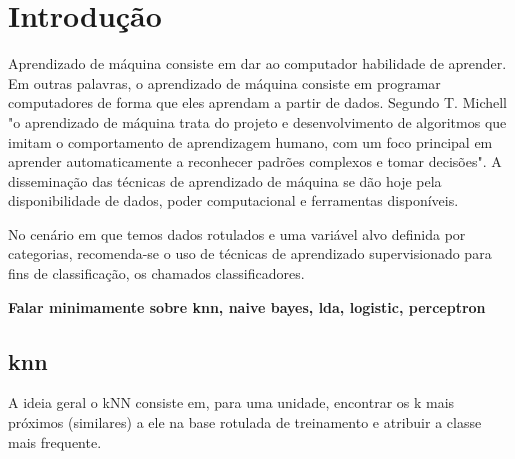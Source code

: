 \documentclass[
	12pt,				%
	openright,			%
	twoside,			%
	a4paper,			%
	english,			%
	brazil,				%
	svgnames
	]{abntex2}\usepackage[]{graphicx}\usepackage[]{color}
\begin{document}

\tableofcontents*
\cleardoublepage

\textual

\chapter{Introdução}
\label{cap:introducao}


Aprendizado de máquina consiste em dar ao computador habilidade de aprender. Em outras palavras, o aprendizado de máquina consiste em programar computadores de forma que eles aprendam a partir de dados. Segundo T. Michell "o aprendizado de máquina trata do projeto e desenvolvimento de algoritmos que imitam o comportamento de aprendizagem humano, com um foco principal em aprender automaticamente a reconhecer padrões complexos e tomar decisões". A disseminação das técnicas de aprendizado de máquina se dão hoje pela disponibilidade de dados, poder computacional e ferramentas disponíveis.

No cenário em que temos dados rotulados e uma variável alvo definida por categorias, recomenda-se o uso de técnicas de aprendizado supervisionado para fins de classificação, os chamados classificadores. 


\textbf{Falar minimamente sobre knn, naive bayes, lda, logistic, perceptron}

\section{knn}

A ideia geral o kNN consiste em, para uma unidade, encontrar os k mais próximos (similares) a ele na base rotulada de treinamento e atribuir a classe mais frequente.
\end{document}

